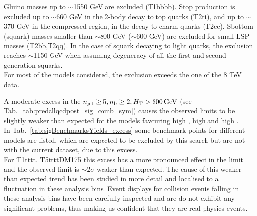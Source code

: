\newpage
Gluino masses up to $\sim$1550 GeV are excluded (T1bbbb). 
Stop production is excluded up to $\sim$660 GeV in the 2-body decay to top quarks (T2tt), 
and up to $\sim$370 GeV in the compressed region, in the decay to charm quarks (T2cc). 
Sbottom (squark) masses smaller than $\sim$800 GeV ($\sim$600 GeV) are excluded for small LSP masses (T2bb,T2qq). 
In the case of squark decaying to light quarks, the exclusion reaches $\sim$1150 GeV when assuming degeneracy of 
all the first and second generation squarks. \\
For most of the models considered, the exclusion exceeds the one of the 8 TeV data. 

A moderate excess in the $n_{\text{jet}}\geq5, n_{\text{b}}\geq2, \mbox{$H_\text{T}$} > 800 \, \mathrm{GeV}$ (see Tab.~\ref{tab:predallqcdpost_sig_comb_sym})
causes the observed limits to be slightly weaker than expected for the models favouring high \nb, high \nj and high \scalht. \\
In Tab.~\ref{tab:sigBenchmarksYields_excess} some benchmark points for different models are listed, 
which are expected to be excluded by this search but are not with the current dataset, due to this excess. \\
For T1tttt, T5ttttDM175 this excess has a more pronounced effect in the limit and the observed limit is $\sim 2\sigma$ 
weaker than expected. The cause of this weaker than expected trend has been studied in more detail
and localised to a fluctuation in these analysis bins. Event displays for collision events 
falling in these analysis bins have been carefully inspected and are do not exhibit any 
significant problems, thus making us confident that they are real physics events. 





